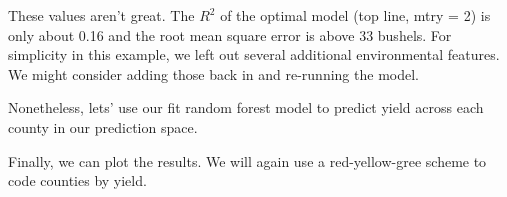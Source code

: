 \documentclass[
]{book}
\newenvironment{Shaded}{\begin{snugshade}}{\end{snugshade}}
\newcommand{\AttributeTok}[1]{\textcolor[rgb]{0.77,0.63,0.00}{#1}}
\newcommand{\DecValTok}[1]{\textcolor[rgb]{0.00,0.00,0.81}{#1}}
\newcommand{\FloatTok}[1]{\textcolor[rgb]{0.00,0.00,0.81}{#1}}
\newcommand{\FunctionTok}[1]{\textcolor[rgb]{0.00,0.00,0.00}{#1}}
\newcommand{\NormalTok}[1]{#1}
\newcommand{\OtherTok}[1]{\textcolor[rgb]{0.56,0.35,0.01}{#1}}
\newcommand{\SpecialCharTok}[1]{\textcolor[rgb]{0.00,0.00,0.00}{#1}}
\newcommand{\StringTok}[1]{\textcolor[rgb]{0.31,0.60,0.02}{#1}}
\begin{document}
These values aren't great. The \(R^2\) of the optimal model (top line, mtry = 2) is only about 0.16 and the root mean square error is above 33 bushels. For simplicity in this example, we left out several additional environmental features. We might consider adding those back in and re-running the model.

Nonetheless, lets' use our fit random forest model to predict yield across each county in our prediction space.

\begin{Shaded}
\end{Shaded}

Finally, we can plot the results. We will again use a red-yellow-gree scheme to code counties by yield.

\begin{Shaded}
\end{Shaded}
\end{document}
